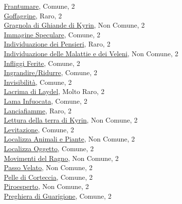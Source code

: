 \begin{multicols}{3}
{{\hyperlink{Frantumare}{Frantumare}, Comune, 2\\
\hyperlink{Goffaggine}{Goffaggine}, Raro, 2\\
\hyperlink{Gragnola di Ghiande di Kyrin}{Gragnola di Ghiande di Kyrin}, Non Comune, 2\\
\hyperlink{Immagine Speculare}{Immagine Speculare}, Comune, 2\\
\hyperlink{Individuazione dei Pensieri}{Individuazione dei Pensieri}, Raro, 2\\
\hyperlink{Individuazione delle Malattie e dei Veleni}{Individuazione delle Malattie e dei Veleni}, Non Comune, 2\\
\hyperlink{Infliggi Ferite}{Infliggi Ferite}, Comune, 2\\
\hyperlink{Ingrandire/Ridurre}{Ingrandire/Ridurre}, Comune, 2\\
\hyperlink{Invisibilità}{Invisibilità}, Comune, 2\\
\hyperlink{Lacrima di Laydel}{Lacrima di Laydel}, Molto Raro, 2\\
\hyperlink{Lama Infuocata}{Lama Infuocata}, Comune, 2\\
\hyperlink{Lanciafiamme}{Lanciafiamme}, Raro, 2\\
\hyperlink{Lettura della terra di Kyrin}{Lettura della terra di Kyrin}, Non Comune, 2\\
\hyperlink{Levitazione}{Levitazione}, Comune, 2\\
\hyperlink{Localizza Animali e Piante}{Localizza Animali e Piante}, Non Comune, 2\\
\hyperlink{Localizza Oggetto}{Localizza Oggetto}, Comune, 2\\
\hyperlink{Movimenti del Ragno}{Movimenti del Ragno}, Non Comune, 2\\
\hyperlink{Passo Velato}{Passo Velato}, Non Comune, 2\\
\hyperlink{Pelle di Corteccia}{Pelle di Corteccia}, Comune, 2\\
\hyperlink{Piroesperto}{Piroesperto}, Non Comune, 2\\
\hyperlink{Preghiera di Guarigione}{Preghiera di Guarigione}, Comune, 2\\
}}
\end{multicols}
